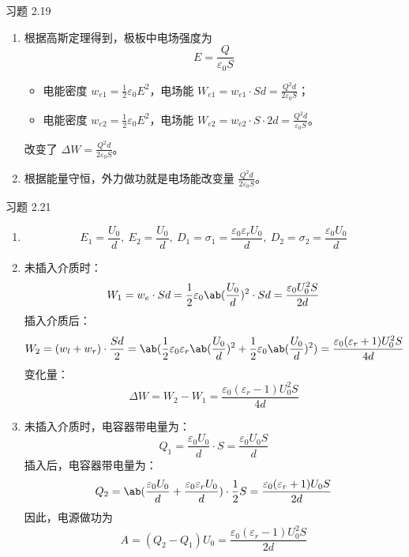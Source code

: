 \begin{problem}
	习题 2.19
	\begin{solution}
		\begin{enumerate}
			\item[\textbf{1)}] 根据高斯定理得到，极板中电场强度为
			$$
			E = \frac{Q}{\varepsilon_0 S}
			$$
			\begin{itemize}
				\item 电能密度 $w_{e 1} = \frac{1}{2} \varepsilon_0 E^2$，电场能 $W_{e 1} = w_{e 1} \cdot Sd = \frac{Q^2 d}{2 \varepsilon_0 S}$；
				\item 电能密度 $w_{e 2} = \frac{1}{2} \varepsilon_0 E^2$，电场能 $W_{e 2} = w_{e 2} \cdot S \cdot 2d = \frac{Q^2 d}{\varepsilon_0 S}$。
			\end{itemize}
			改变了 $\Delta W = \frac{Q^2 d}{2 \varepsilon_0 S}$。

			\item[\textbf{2)}] 根据能量守恒，外力做功就是电场能改变量 $\frac{Q^2 d}{2 \varepsilon_0 S}$。
		\end{enumerate}
	\end{solution}
\end{problem}

\begin{problem}
	习题 2.21
	\begin{solution}
		\begin{enumerate}
			\item[\textbf{1)}]
			$$
			E_1 = \frac{U_0}{d},\ E_2 = \frac{U_0}{d},\ D_1 = \sigma_1 = \frac{\varepsilon_0 \varepsilon_r U_0}{d},\ D_2 = \sigma_2 = \frac{\varepsilon_0 U_0}{d}
			$$
			\item[\textbf{2)}] 未插入介质时：
			$$
			W_1 = w_e \cdot S d = \frac{1}{2} \varepsilon_0 \ab(\frac{U_0}{d})^2 \cdot S d = \frac{\varepsilon_0 U_0^2 S}{2 d}
			$$
			插入介质后：
			$$
			W_2 = (w_l + w_r) \cdot \frac{S d}{2} = \ab(\frac{1}{2} \varepsilon_0 \varepsilon_r \ab(\frac{U_0}{d})^2 + \frac{1}{2} \varepsilon_0 \ab(\frac{U_0}{d})^2) = \frac{\varepsilon_0 (\varepsilon_r + 1) U_0^2 S}{4 d}
			$$
			变化量：
			$$
			\Delta W = W_2 - W_1 = \frac{\varepsilon_0 (\varepsilon_r - 1) U_0^2 S}{4 d}
			$$
			
			\item[\textbf{3)}] 未插入介质时，电容器带电量为：
			$$
			Q_1 = \frac{\varepsilon_0 U_0}{d} \cdot S = \frac{\varepsilon_0 U_0 S}{d}
			$$
			插入后，电容器带电量为：
			$$
			Q_2 = \ab(\frac{\varepsilon_0 U_0}{d} + \frac{\varepsilon_0 \varepsilon_r U_0}{d}) \cdot \frac{1}{2} S = \frac{\varepsilon_0 (\varepsilon_r + 1) U_0 S}{2 d}
			$$
			因此，电源做功为
			$$
			A = (Q_2 - Q_1) U_0 = \frac{\varepsilon_0 (\varepsilon_r - 1) U_0^2 S}{2 d}
			$$
		\end{enumerate}
	\end{solution}
\end{problem}
